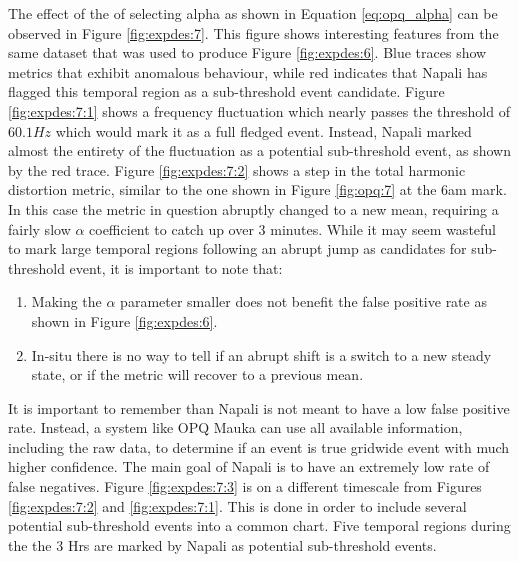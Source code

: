 The effect of the of selecting alpha as shown in Equation \ref{eq:opq_alpha} can be observed in Figure \ref{fig:expdes:7}.
This figure shows interesting features from the same dataset that was used to produce Figure \ref{fig:expdes:6}.
Blue traces show metrics that exhibit anomalous behaviour, while red indicates that Napali has flagged this temporal region as a sub-threshold event candidate.
Figure \ref{fig:expdes:7:1} shows a frequency fluctuation which nearly passes the threshold of $60.1Hz$ which would mark it as a full fledged event.
Instead, Napali marked almost the entirety of the fluctuation as a potential sub-threshold event, as shown by the red trace.
Figure \ref{fig:expdes:7:2} shows a step in the total harmonic distortion metric, similar to the one shown in Figure \ref{fig:opq:7} at the 6am mark.
In this case the metric in question abruptly changed to a new mean, requiring a fairly slow $\alpha$ coefficient to catch up over 3 minutes.
While it may seem wasteful to mark large temporal regions following an abrupt jump as candidates for sub-threshold event, it is important to note that:
\begin{enumerate}
    \item Making the $\alpha$ parameter smaller does not benefit the false positive rate as shown in Figure \ref{fig:expdes:6}.
    \item In-situ there is no way to tell if an abrupt shift is a switch to a new steady state, or if the metric will recover to a previous mean.
\end{enumerate}
It is important to remember than Napali is not meant to have a low false positive rate.
Instead, a system like OPQ Mauka can use all available information, including the raw data, to determine if an event is true gridwide event with much higher confidence.
The main goal of Napali is to have an extremely low rate of false negatives.
Figure \ref{fig:expdes:7:3} is on a different timescale from Figures \ref{fig:expdes:7:2} and \ref{fig:expdes:7:1}.
This is done in order to include several potential sub-threshold events into a common chart.
Five temporal regions during the the 3 Hrs are marked by Napali as potential sub-threshold events.
